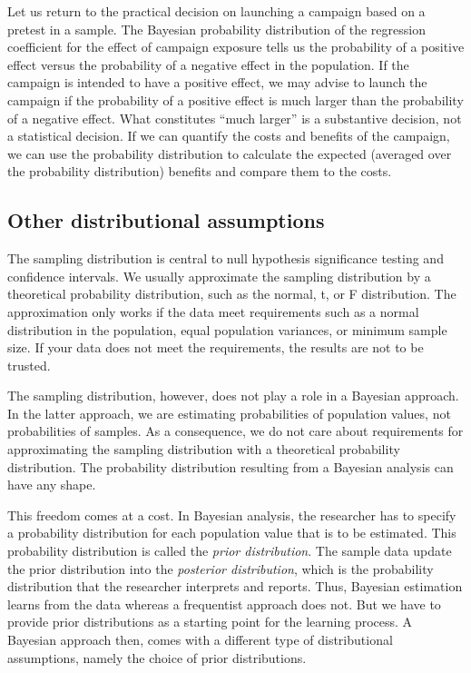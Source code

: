 \documentclass[doc]{apa6}
\begin{document}
Let us return to the practical decision on launching a campaign based on
a pretest in a sample. The Bayesian probability distribution of the
regression coefficient for the effect of campaign exposure tells us the
probability of a positive effect versus the probability of a negative
effect in the population. If the campaign is intended to have a positive
effect, we may advise to launch the campaign if the probability of a
positive effect is much larger than the probability of a negative
effect. What constitutes \enquote{much larger} is a substantive
decision, not a statistical decision. If we can quantify the costs and
benefits of the campaign, we can use the probability distribution to
calculate the expected (averaged over the probability distribution)
benefits and compare them to the costs.

\subsection{Other distributional assumptions}\label{assumptions}

The sampling distribution is central to null hypothesis significance
testing and confidence intervals. We usually approximate the sampling
distribution by a theoretical probability distribution, such as the
normal, t, or F distribution. The approximation only works if the data
meet requirements such as a normal distribution in the population, equal
population variances, or minimum sample size. If your data does not meet
the requirements, the results are not to be trusted.

The sampling distribution, however, does not play a role in a Bayesian
approach. In the latter approach, we are estimating probabilities of
population values, not probabilities of samples. As a consequence, we do
not care about requirements for approximating the sampling distribution
with a theoretical probability distribution. The probability
distribution resulting from a Bayesian analysis can have any shape.

This freedom comes at a cost. In Bayesian analysis, the researcher has
to specify a probability distribution for each population value that is
to be estimated. This probability distribution is called the \emph{prior
distribution}. The sample data update the prior distribution into the
\emph{posterior distribution}, which is the probability distribution
that the researcher interprets and reports. Thus, Bayesian estimation
learns from the data whereas a frequentist approach does not. But we
have to provide prior distributions as a starting point for the learning
process. A Bayesian approach then, comes with a different type of
distributional assumptions, namely the choice of prior distributions.
\end{document}
